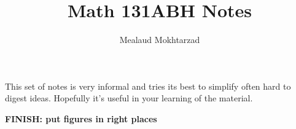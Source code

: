 \documentclass{article}
\title{Math 131ABH Notes}
\author{Mealaud Mokhtarzad}
\date{}
\begin{document}
\maketitle

This set of notes is very informal and tries its best to simplify often hard to digest ideas. Hopefully it's useful in your learning of the material.

\textbf{FINISH: put figures in right places}

\newpage

\renewcommand{\headrulewidth}{0pt}
\tableofcontents
\newpage

\renewcommand{\headrulewidth}{0.4pt}



\end{document}
